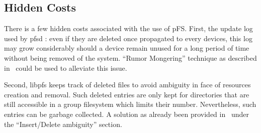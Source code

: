 \subsection{Hidden Costs}

There is a few hidden costs associated with the use of pFS. First, the
update log used by pfsd : even if they are deleted once propagated to
every devices, this log may grow considerably should a device remain
unused for a long period of time without being removed of the
system. ``Rumor Mongering'' technique as described
in~\cite{demers:epidemic} could be used to alleviate this issue.

Second, libpfs keeps track of deleted files to avoid ambiguity
in face of resources creation and removal. Such deleted entries are
only kept for directories that are still accessible in a group
filesystem which limits their number. Nevertheless, such entries can
be garbage collected. A solution as already been provided
in~\cite{page:ficus} under the ``Insert/Delete ambiguity'' section.

\endinput


